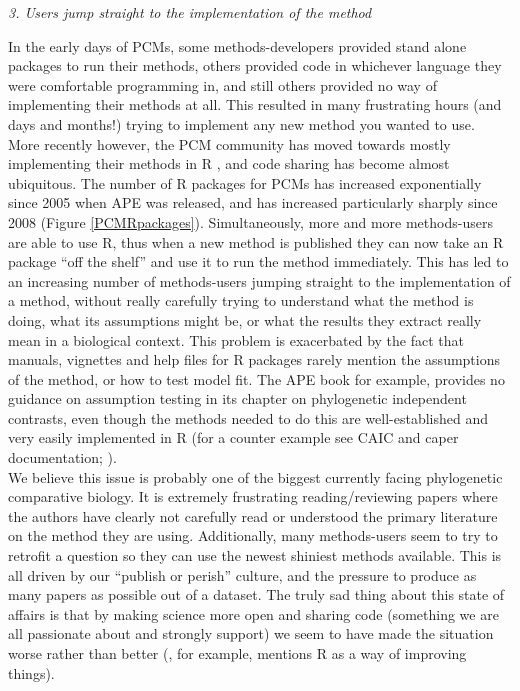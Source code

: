 \documentclass[a4paper,12pt]{article}
\renewcommand{\subsection}[1]{
  \bigskip
  \begin{center}
  \begin{large}
  \normalfont\itshape #1
  \end{large}
  \end{center}
}
\begin{document}
\subsection{3. Users jump straight to the implementation of the method}
In the early days of PCMs, some methods-developers provided stand alone packages to run their methods, others provided code in whichever language they were comfortable programming in, and still others provided no way of implementing their methods at all. 
This resulted in many frustrating hours (and days and months!) trying to implement any new method you wanted to use.\\

More recently however, the PCM community has moved towards mostly implementing their methods in R \citep{R-Core-Team:2014aa}, and code sharing has become almost ubiquitous. 
The number of R packages for PCMs has increased exponentially since 2005 when APE \citep{Paradis:2004aa} was released, and has increased particularly sharply since 2008 (Figure \ref{PCMRpackages}).
Simultaneously, more and more methods-users are able to use R, thus when a new method is published they can now take an R package ``off the shelf'' and use it to run the method immediately.
This has led to an increasing number of methods-users jumping straight to the implementation of a method, without really carefully trying to understand what the method is doing, what its assumptions might be, or what the results they extract really mean in a biological context.
This problem is exacerbated by the fact that manuals, vignettes and help files for R packages rarely mention the assumptions of the method, or how to test model fit. 
The APE book \citep{paradis2011analysis} for example, provides no guidance on assumption testing in its chapter on phylogenetic independent contrasts, even though the methods needed to do this are well-established and very easily implemented in R (for a counter example see CAIC and caper documentation; \citep{purvis1995comparative,Orme:2013aa}).\\
We believe this issue is probably one of the biggest currently facing phylogenetic comparative biology. It is extremely frustrating reading/reviewing papers where the authors have clearly not carefully read or understood the primary literature on the method they are using. 
Additionally, many methods-users seem to try to retrofit a question so they can use the newest shiniest methods available. This is all driven by our ``publish or perish'' culture, and the pressure to produce as many papers as possible out of a dataset.
The truly sad thing about this state of affairs is that by making science more open and sharing code (something we are all passionate about and strongly support) we seem to have made the situation worse rather than better (\citealp{freckleton2009seven}, for example, mentions R as a way of improving things). %
\end{document}
